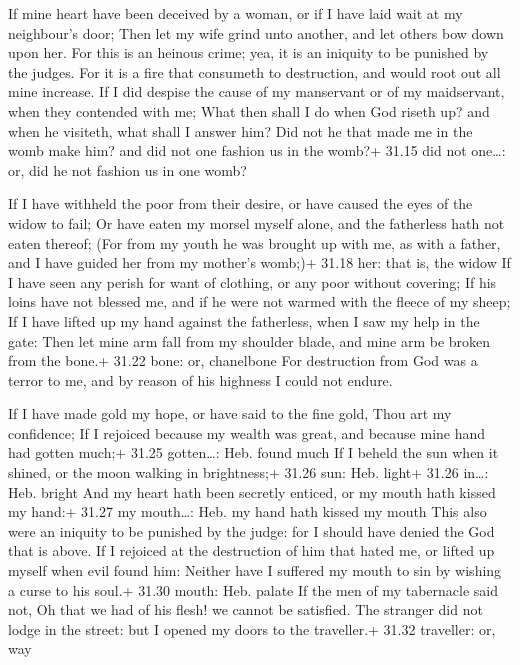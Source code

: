  If mine heart have been deceived by a woman, or if I have
laid wait at my neighbour's door;  Then let my wife grind
unto another, and let others bow down upon her.  For this
is an heinous crime; yea, it is an iniquity to be punished by the
judges.  For it is a fire that consumeth to destruction,
and would root out all mine increase.  If I did despise the
cause of my manservant or of my maidservant, when they contended with
me;  What then shall I do when God riseth up? and when he
visiteth, what shall I answer him?  Did not he that made me
in the womb make him? and did not one fashion us in the womb?+ 31.15 did
not one\ldots: or, did he not fashion us in one womb?

 If I have withheld the poor from their desire, or have
caused the eyes of the widow to fail;  Or have eaten my
morsel myself alone, and the fatherless hath not eaten thereof;
 (For from my youth he was brought up with me, as with a
father, and I have guided her from my mother's womb;)+ 31.18 her: that
is, the widow  If I have seen any perish for want of
clothing, or any poor without covering;  If his loins have
not blessed me, and if he were not warmed with the fleece of my sheep;
 If I have lifted up my hand against the fatherless, when I
saw my help in the gate:  Then let mine arm fall from my
shoulder blade, and mine arm be broken from the bone.+ 31.22 bone: or,
chanelbone  For destruction from God was a terror to me,
and by reason of his highness I could not endure.

 If I have made gold my hope, or have said to the fine
gold, Thou art my confidence;  If I rejoiced because my
wealth was great, and because mine hand had gotten much;+ 31.25
gotten\ldots: Heb. found much  If I beheld the sun when it
shined, or the moon walking in brightness;+ 31.26 sun: Heb. light+ 31.26
in\ldots: Heb. bright  And my heart hath been secretly
enticed, or my mouth hath kissed my hand:+ 31.27 my mouth\ldots: Heb. my
hand hath kissed my mouth  This also were an iniquity to be
punished by the judge: for I should have denied the God that is above.
 If I rejoiced at the destruction of him that hated me, or
lifted up myself when evil found him:  Neither have I
suffered my mouth to sin by wishing a curse to his soul.+ 31.30 mouth:
Heb. palate  If the men of my tabernacle said not, Oh that
we had of his flesh! we cannot be satisfied.  The stranger
did not lodge in the street: but I opened my doors to the traveller.+
31.32 traveller: or, way

